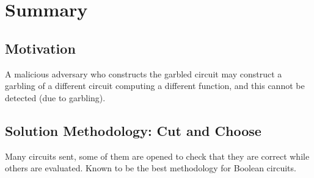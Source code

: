 
\clearpage
{}

%
\setcounter{section}{0} %

\section{Summary}

\subsection{Motivation}
A malicious adversary who constructs the garbled circuit may construct a garbling of a different circuit computing a different function, and this cannot be detected (due to garbling).

\subsection{Solution Methodology: Cut and Choose}
Many circuits sent, some of them are opened to check that they are correct while others are evaluated. Known to be the best methodology for Boolean circuits.

